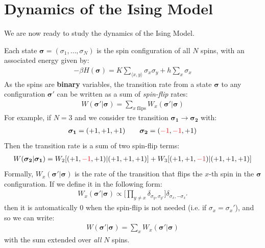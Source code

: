\documentclass[../../main.tex]{subfiles}
\begin{document}
\section{Dynamics of the Ising Model}\label{sec:dynamics-ising}

We are now ready to study the dynamics of the Ising Model. 

Each state $\bm{\sigma} = (\sigma_1, \dots, \sigma_N)$ is the spin configuration of all $N$ spins, with an associated energy given by:
\begin{align*}
    -\beta H(\bm{\sigma}) = K \sum_{\langle x,y \rangle} \sigma_x \sigma_y + h \sum_x \sigma_x
\end{align*}
As the spins are \textbf{binary} variables, the transition rate from a state $\bm{\sigma}$ to any configuration $\bm{\sigma'}$ can be written as a sum of \textit{spin-flip} rates:
\begin{align*}
    W(\bm{\sigma}'|\bm{\sigma}) = \sum_{x\>\mathrm{flips}} W_x(\bm{\sigma'}|\bm{\sigma})
\end{align*}  
For example, if $N=3$ and we consider tre transition $\bm{\sigma_1} \to \bm{\sigma_2}$ with:
\begin{align*}
    \bm{\sigma_1} = (+1,+1,+1) \qquad \bm{\sigma_2} = (\textcolor{Red}{-1},\textcolor{Red}{-1},+1)
\end{align*}
Then the transition rate is a sum of two spin-flip terms:
\begin{align*}
    W(\bm{\sigma_2}|\bm{\sigma_1}) = W_2[(+1,\textcolor{Red}{-1},+1)|(+1,+1,+1)] + W_3[(+1,+1,\textcolor{Red}{-1})|(+1,+1,+1)]
\end{align*}
Formally, $W_x(\bm{\sigma'}|\bm{\sigma})$ is the rate of the transition that flips the $x$-th spin in the $\bm{\sigma}$ configuration. If we define it in the following form:
\begin{align}\label{eqn:spin-flip-rate}
    W_x(\bm{\sigma'}|\bm{\sigma}) \propto \Big[\prod_{y \neq x} \delta_{\sigma_y, \sigma_{y'}}\Big] \delta_{\sigma_x, -\sigma_x'}
\end{align}
then it is automatically $0$ when the spin-flip is not needed (i.e. if $\sigma_x = \sigma_x'$), and so we can write:
\begin{align*}
    W(\bm{\sigma'}|\bm{\sigma}) = \sum_x W_x(\bm{\sigma'}|\bm{\sigma})
\end{align*}
with the sum extended over \textit{all} $N$ spins.

\medskip
\end{document}
